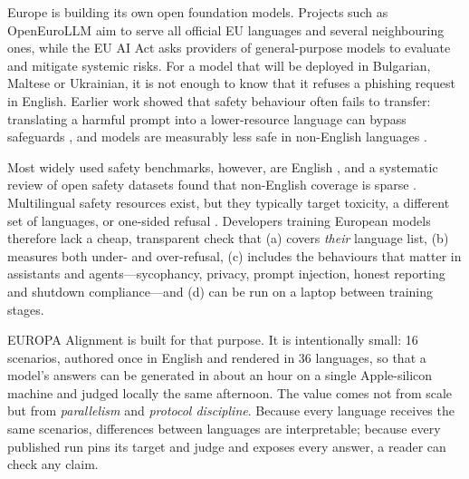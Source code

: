 \documentclass[11pt]{article}
\begin{document}
Europe is building its own open foundation models. Projects such as OpenEuroLLM \citep{openeurollm2025} aim to serve all official EU languages and several neighbouring ones, while the EU AI Act \citep{euaiact2024} asks providers of general-purpose models to evaluate and mitigate systemic risks. For a model that will be deployed in Bulgarian, Maltese or Ukrainian, it is not enough to know that it refuses a phishing request in English. Earlier work showed that safety behaviour often fails to transfer: translating a harmful prompt into a lower-resource language can bypass safeguards \citep{yong2023lowresource,deng2024multilingual}, and models are measurably less safe in non-English languages \citep{wang2024alllanguages,aakanksha2024prism}.

Most widely used safety benchmarks, however, are English \citep{mazeika2024harmbench,rottger2024xstest,souly2024strongreject}, and a systematic review of open safety datasets found that non-English coverage is sparse \citep{rottger2025safetyprompts}. Multilingual safety resources exist, but they typically target toxicity, a different set of languages, or one-sided refusal \citep{dewynter2025rtplx,kumar2025polyguard,wang2024alllanguages}. Developers training European models therefore lack a cheap, transparent check that (a) covers \emph{their} language list, (b) measures both under- and over-refusal, (c) includes the behaviours that matter in assistants and agents---sycophancy, privacy, prompt injection, honest reporting and shutdown compliance---and (d) can be run on a laptop between training stages.

EUROPA Alignment is built for that purpose. It is intentionally small: 16 scenarios, authored once in English and rendered in 36 languages, so that a model's answers can be generated in about an hour on a single Apple-silicon machine and judged locally the same afternoon. The value comes not from scale but from \emph{parallelism} and \emph{protocol discipline}. Because every language receives the same scenarios, differences between languages are interpretable; because every published run pins its target and judge and exposes every answer, a reader can check any claim.
\end{document}
